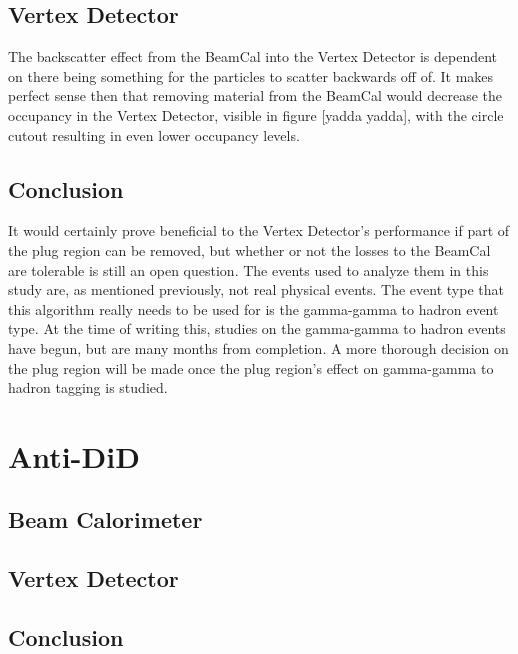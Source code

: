 \documentclass{report}
\begin{document}
            \subsection{Vertex Detector} 
                The backscatter effect from the BeamCal into the Vertex Detector is dependent on there being something for the particles to scatter backwards off of. It makes perfect sense then that removing material from the BeamCal would decrease the occupancy in the Vertex Detector, visible in figure [yadda yadda], with the circle cutout resulting in even lower occupancy levels.
                

            \subsection{Conclusion} 
                 It would certainly prove beneficial to the Vertex Detector's performance if part of the plug region can be removed, but whether or not the losses to the BeamCal are tolerable is still an open question. The events used to analyze them in this study are, as mentioned previously, not real physical events. The event type that this algorithm really needs to be used for is the gamma-gamma to hadron event type. At the time of writing this, studies on the gamma-gamma to hadron events have begun, but are many months from completion. A more thorough decision on the plug region will be made once the plug region's effect on gamma-gamma to hadron tagging is studied.

        
        \section{Anti-DiD}
            \subsection{Beam Calorimeter}

            \subsection{Vertex Detector} 

            \subsection{Conclusion}







        
    
\end{document}

